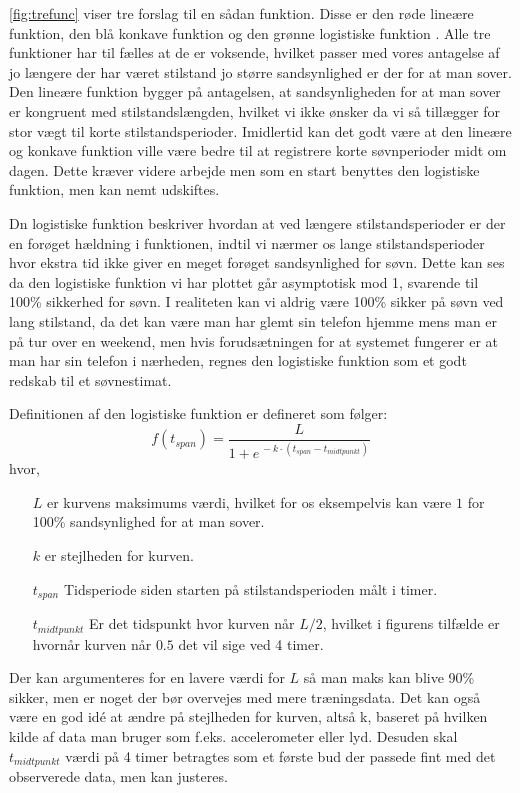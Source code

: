 \cref{fig:trefunc} viser tre forslag til en sådan funktion.
Disse er den røde lineære funktion, den blå konkave funktion og den grønne logistiske funktion \citep{wiki:LogisticFunction}.
Alle tre funktioner har til fælles at de er voksende, hvilket passer med vores antagelse af jo længere der har været stilstand jo større sandsynlighed er der for at man sover.
Den lineære funktion bygger på antagelsen, at sandsynligheden for at man sover er kongruent med stilstandslængden, hvilket vi ikke ønsker da vi så tillægger for stor vægt til korte stilstandsperioder. Imidlertid kan det godt være at den lineære og konkave funktion ville være bedre til at registrere korte søvnperioder midt om dagen.
Dette kræver videre arbejde men som en start benyttes den logistiske funktion, men kan nemt udskiftes.


Dn logistiske funktion beskriver hvordan at ved længere stilstandsperioder er der en forøget hældning i funktionen, indtil vi nærmer os lange stilstandsperioder hvor ekstra tid ikke giver en meget forøget sandsynlighed for søvn. 
Dette kan ses da den logistiske funktion vi har plottet går asymptotisk mod 1, svarende til 100\% sikkerhed for søvn.
I realiteten kan vi aldrig være 100\% sikker på søvn ved lang stilstand, da det kan være man har glemt sin telefon hjemme mens man er på tur over en weekend, men hvis forudsætningen for at systemet fungerer er at man har sin telefon i nærheden, regnes den logistiske funktion som et godt redskab til et søvnestimat.

Definitionen af den logistiske funktion er defineret som følger:
\begin{equation}
	f(t_{span}) = \frac{L}{1+e^{\,-k\cdot(t_{span} - t_{midtpunkt})}}
\end{equation} 
hvor,
\begin{itemize}
	\item[$L$] er kurvens maksimums værdi, hvilket for os eksempelvis kan være $1$ for 100\% sandsynlighed for at man sover.
	\item[$k$] er stejlheden for kurven.
	\item[$t_{span}$] Tidsperiode siden starten på stilstandsperioden målt i timer.
	\item[$t_{midtpunkt}$] Er det tidspunkt hvor kurven når $L/2$, hvilket i figurens tilfælde er hvornår kurven når $0.5$ det vil sige ved 4 timer.
\end{itemize}

Der kan argumenteres for en lavere værdi for $L$ så man maks kan blive 90\% sikker, men er noget der bør overvejes med mere træningsdata. 
Det kan også være en god idé at ændre på stejlheden for kurven, altså k, baseret på hvilken kilde af data man bruger som f.eks. accelerometer eller lyd.
Desuden skal $t_{midtpunkt}$ værdi på 4 timer betragtes som et første bud der passede fint med det observerede data, men kan justeres.

